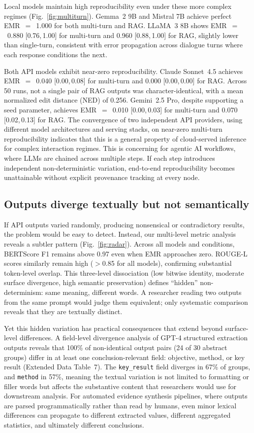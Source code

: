 \documentclass[sn-nature]{sn-jnl}
\begin{document}
Local models maintain high reproducibility even under these more complex regimes (Fig.~\ref{fig:multiturn}).
Gemma~2 9B and Mistral 7B achieve perfect EMR~$=$~1.000 for both multi-turn and RAG.
LLaMA~3 8B shows EMR~$=$~0.880 [0.76,\,1.00] for multi-turn and 0.960 [0.88,\,1.00] for RAG, slightly lower than single-turn, consistent with error propagation across dialogue turns where each response conditions the next.

Both API models exhibit near-zero reproducibility.
Claude Sonnet~4.5 achieves EMR~$=$~0.040 [0.00,\,0.08] for multi-turn and 0.000 [0.00,\,0.00] for RAG. Across 50 runs, not a single pair of RAG outputs was character-identical, with a mean normalized edit distance (NED) of 0.256.
Gemini~2.5 Pro, despite supporting a seed parameter, achieves EMR~$=$~0.010 [0.00,\,0.03] for multi-turn and 0.070 [0.02,\,0.13] for RAG.
The convergence of two independent API providers, using different model architectures and serving stacks, on near-zero multi-turn reproducibility indicates that this is a general property of cloud-served inference for complex interaction regimes.
This is concerning for agentic AI workflows, where LLMs are chained across multiple steps.
If each step introduces independent non-deterministic variation, end-to-end reproducibility becomes unattainable without explicit provenance tracking at every node.


\subsection{Outputs diverge textually but not semantically}\label{subsec:semantic}

If API outputs varied randomly, producing nonsensical or contradictory results, the problem would be easy to detect.
Instead, our multi-level metric analysis reveals a subtler pattern (Fig.~\ref{fig:radar}).
Across all models and conditions, BERTScore F1 remains above 0.97 even when EMR approaches zero.
ROUGE-L scores similarly remain high ($>$0.85 for all models), confirming substantial token-level overlap.
This three-level dissociation (low bitwise identity, moderate surface divergence, high semantic preservation) defines ``hidden'' non-determinism: same meaning, different words.
A researcher reading two outputs from the same prompt would judge them equivalent; only systematic comparison reveals that they are textually distinct.

Yet this hidden variation has practical consequences that extend beyond surface-level differences.
A field-level divergence analysis of GPT-4 structured extraction outputs reveals that 100\% of non-identical output pairs (24 of 30 abstract groups) differ in at least one conclusion-relevant field: objective, method, or key result (Extended Data Table~7).
The \texttt{key\_result} field diverges in 67\% of groups, and \texttt{method} in 57\%, meaning the textual variation is not limited to formatting or filler words but affects the substantive content that researchers would use for downstream analysis.
For automated evidence synthesis pipelines, where outputs are parsed programmatically rather than read by humans, even minor lexical differences can propagate to different extracted values, different aggregated statistics, and ultimately different conclusions.
\end{document}
